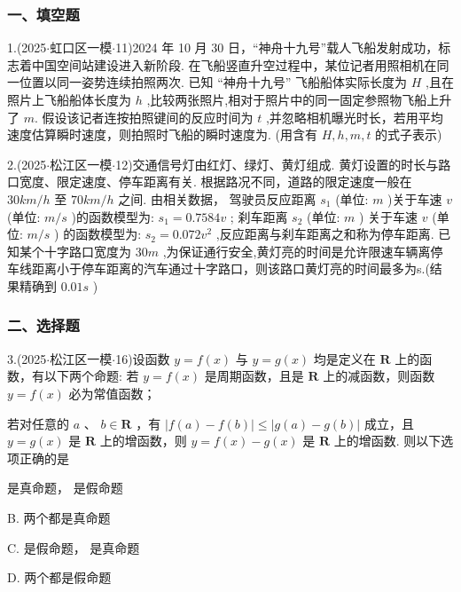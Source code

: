\subsubsection*{一、填空题}

1.(2025$\cdot$虹口区一模$\cdot$11)2024 年 10 月 30 日，“神舟十九号”载人飞船发射成功，标志着中国空间站建设进入新阶段. 在飞船竖直升空过程中，某位记者用照相机在同一位置以同一姿势连续拍照两次. 已知 “神舟十九号” 飞船船体实际长度为 $H$ ,且在照片上飞船船体长度为 $h$ ,比较两张照片,相对于照片中的同一固定参照物飞船上升了 $m$. 假设该记者连按拍照键间的反应时间为 $t$ ,并忽略相机曝光时长，若用平均速度估算瞬时速度，则拍照时飞船的瞬时速度为\blkda[2]{}. (用含有 $H,h,m,t$ 的式子表示)

2.(2025$\cdot$松江区一模$\cdot$12)交通信号灯由红灯、绿灯、黄灯组成. 黄灯设置的时长与路口宽度、限定速度、停车距离有关. 根据路况不同，道路的限定速度一般在 ${30}{{km}}/{h}$ 至 ${70}{{km}}/{h}$ 之间. 由相关数据， 驾驶员反应距离 ${s}_{1}$ (单位: ${m}$ )关于车速 $v$ (单位: ${m}/{s}$ )的函数模型为: ${s}_{1} = {0.7584v}$ ; 刹车距离 ${s}_{2}$ (单位: ${m}$ ) 关于车速 $v$ (单位: ${m}/{s}$ ) 的函数模型为: ${s}_{2} = {0.072}{v}^{2}$ ,反应距离与刹车距离之和称为停车距离. 已知某个十字路口宽度为 ${30}{m}$ ,为保证通行安全,黄灯亮的时间是允许限速车辆离停车线距离小于停车距离的汽车通过十字路口，则该路口黄灯亮的时间最多为\blkda[2]{}s.(结果精确到 ${0.01}{s}$ )

\subsubsection*{二、选择题}

3.(2025$\cdot$松江区一模$\cdot$16)设函数 $y = f\left( x\right)$ 与 $y = g\left( x\right)$ 均是定义在 $\mathbf{R}$ 上的函数，有以下两个命题:    若 $y = f\left( x\right)$ 是周期函数，且是 $\mathbf{R}$ 上的减函数，则函数 $y = f\left( x\right)$ 必为常值函数；

   若对任意的 $a$ 、 $b \in  \mathbf{R}$ ，有 $\left| {f\left( a\right)  - f\left( b\right) }\right|  \leq  \left| {g\left( a\right)  - g\left( b\right) }\right|$ 成立，且 $y = g\left( x\right)$ 是 $\mathbf{R}$ 上的增函数，则 $y = f\left( x\right)  - g\left( x\right)$ 是 $\mathbf{R}$ 上的增函数. 则以下选项正确的是 \dotfill{(\kh{})}

\xx{}{}{}{}  是真命题，  是假命题

B. 两个都是真命题

C.   是假命题，  是真命题

D. 两个都是假命题

